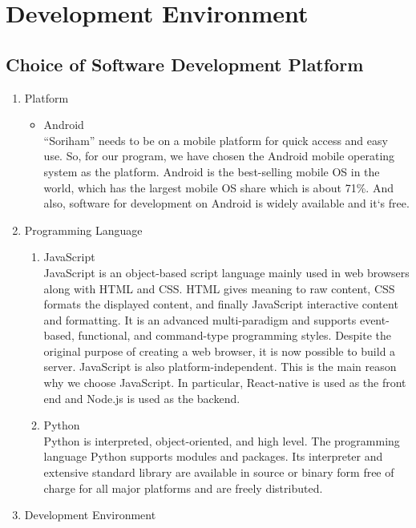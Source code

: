 \documentclass[conference]{IEEEtran}
\begin{document}
\section{Development Environment}

\subsection{Choice of Software Development Platform}
\begin{enumerate}
    \item Platform
    \begin{itemize}
        \item Android\\
        “Soriham” needs to be on a mobile platform for quick access and easy use. So, for our program, we have chosen the Android mobile operating system as the platform. Android is the best-selling mobile OS in the world, which has the largest mobile OS share which is about 71\%. And also, software for development on Android is widely available and it`s free.\\
    \end{itemize}
    \item Programming Language
    \begin{enumerate}
        \item JavaScript\\
        JavaScript is an object-based script language mainly used in web browsers along with HTML and CSS. HTML gives meaning to raw content, CSS formats the displayed content, and finally JavaScript interactive content and formatting.
        It is an advanced multi-paradigm and supports event-based, functional, and command-type programming styles. Despite the original purpose of creating a web browser, it is now possible to build a server. JavaScript is also platform-independent. This is the main reason why we choose JavaScript. In particular, React-native is used as the front end and Node.js is used as the backend.\\
        \item Python\\
        Python is interpreted, object-oriented, and high level. The programming language Python supports modules and packages. Its interpreter and extensive standard library are available in source or binary form free of charge for all major platforms and are freely distributed.\\
    \end{enumerate}
    \item Development Environment

\end{enumerate}
\end{document}
